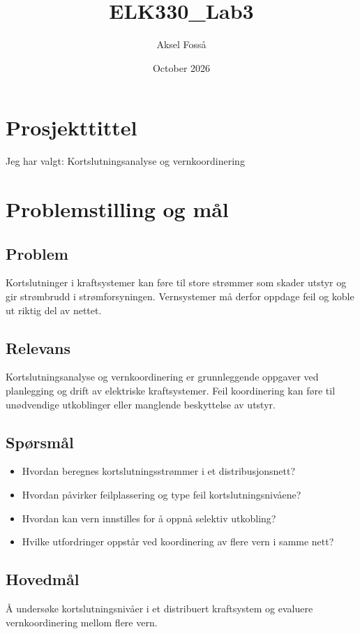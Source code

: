 \documentclass{article}
\title{ELK330\_Lab3}
\author{Aksel Fosså}
\date{October 2026}
\begin{document}
\maketitle
\section{Prosjekttittel}
Jeg har valgt: Kortslutningsanalyse og vernkoordinering

\section{Problemstilling og mål}
\subsection{Problem}
Kortslutninger i kraftsystemer kan føre til store strømmer som skader utstyr og gir strømbrudd i strømforsyningen. Vernsystemer må derfor oppdage feil og koble ut riktig del av nettet.

\subsection{Relevans}

Kortslutningsanalyse og vernkoordinering er grunnleggende oppgaver ved planlegging og drift av elektriske kraftsystemer. Feil koordinering kan føre til unødvendige utkoblinger eller manglende beskyttelse av utstyr.

\subsection{Spørsmål}
\begin{itemize}
    \item Hvordan beregnes kortslutningsstrømmer i et distribusjonsnett?
    \item Hvordan påvirker feilplassering og type feil kortslutningsnivåene?
    \item Hvordan kan vern innstilles for å oppnå selektiv utkobling?
    \item Hvilke utfordringer oppstår ved koordinering av flere vern i samme nett?
\end{itemize}

\subsection{Hovedmål}
Å undersøke kortslutningsnivåer i et distribuert kraftsystem og evaluere vernkoordinering mellom flere vern.
\end{document}
